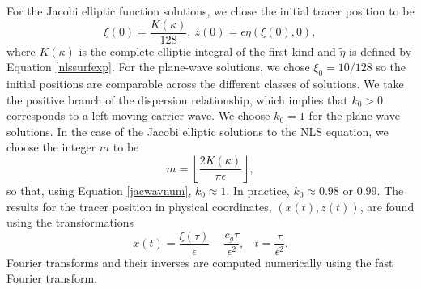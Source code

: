 \documentclass{JFM_Style/jfm}
\begin{document}
For the Jacobi elliptic function solutions, we chose the initial tracer position to be
\[
\xi(0) = \frac{K(\kappa)}{128}, ~ z(0) = \epsilon \tilde{\eta}(\xi(0),0),
\]
where $K(\kappa)$ is the complete elliptic integral of the first kind and $\tilde{\eta}$ is defined by Equation \eqref{nlssurfexp}.  For the plane-wave solutions, we chose $\xi_{0}=10/128$ so the initial positions are comparable across the different classes of solutions.  We take the positive branch of the dispersion relationship, which implies that $k_{0}>0$ corresponds to a left-moving-carrier wave.  We choose $k_{0}=1$ for the plane-wave solutions.  In the case of the Jacobi elliptic solutions to the NLS equation, we choose the integer $m$ to be
\[
m = \left\lfloor \frac{2K(\kappa)}{\pi \epsilon}\right\rfloor,
\]
so that, using Equation \eqref{jacwavnum}, $k_{0}\approx 1$.  In practice, $k_{0}\approx0.98$ or $0.99$.  The results for the tracer position in physical coordinates, $(x(t),z(t))$, are found using the transformations
\[
x(t) = \frac{\xi(\tau)}{\epsilon}-\frac{c_{g}\tau}{\epsilon^{2}}, ~~~~ t = \frac{\tau}{\epsilon^{2}}.
\]
Fourier transforms and their inverses are computed numerically using the fast Fourier transform.
\end{document}
